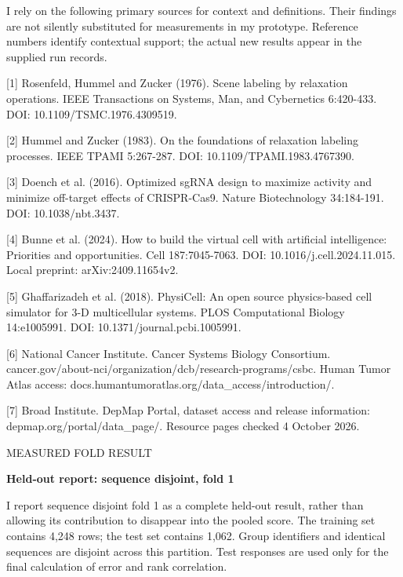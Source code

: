 \documentclass[10pt]{article}
\begin{document}
I rely on the following primary sources for context and definitions. Their findings are not silently substituted for measurements in my prototype. Reference numbers identify contextual support; the actual new results appear in the supplied run records.\par
{\footnotesize [1] Rosenfeld, Hummel and Zucker (1976). Scene labeling by relaxation operations. IEEE Transactions on Systems, Man, and Cybernetics 6:420-433. DOI: 10.1109/TSMC.1976.4309519.\par}
{\footnotesize [2] Hummel and Zucker (1983). On the foundations of relaxation labeling processes. IEEE TPAMI 5:267-287. DOI: 10.1109/TPAMI.1983.4767390.\par}
{\footnotesize [3] Doench et al. (2016). Optimized sgRNA design to maximize activity and minimize off-target effects of CRISPR-Cas9. Nature Biotechnology 34:184-191. DOI: 10.1038/nbt.3437.\par}
{\footnotesize [4] Bunne et al. (2024). How to build the virtual cell with artificial intelligence: Priorities and opportunities. Cell 187:7045-7063. DOI: 10.1016/j.cell.2024.11.015. Local preprint: arXiv:2409.11654v2.\par}
{\footnotesize [5] Ghaffarizadeh et al. (2018). PhysiCell: An open source physics-based cell simulator for 3-D multicellular systems. PLOS Computational Biology 14:e1005991. DOI: 10.1371/journal.pcbi.1005991.\par}
{\footnotesize [6] National Cancer Institute. Cancer Systems Biology Consortium. cancer.gov/about-nci/organization/dcb/research-programs/csbc. Human Tumor Atlas access: docs.humantumoratlas.org/data\_access/introduction/.\par}
{\footnotesize [7] Broad Institute. DepMap Portal, dataset access and release information: depmap.org/portal/data\_page/. Resource pages checked 4 October 2026.\par}
\clearpage
\hypertarget{p20}{}
{\small\color{accent}\MakeUppercase{Measured fold result}}\par
{\LARGE\bfseries\color{ink}Held-out report: sequence disjoint, fold 1}\par\vspace{5pt}
I report sequence disjoint fold 1 as a complete held-out result, rather than allowing its contribution to disappear into the pooled score. The training set contains 4,248 rows; the test set contains 1,062. Group identifiers and identical sequences are disjoint across this partition. Test responses are used only for the final calculation of error and rank correlation.\par
\end{document}
